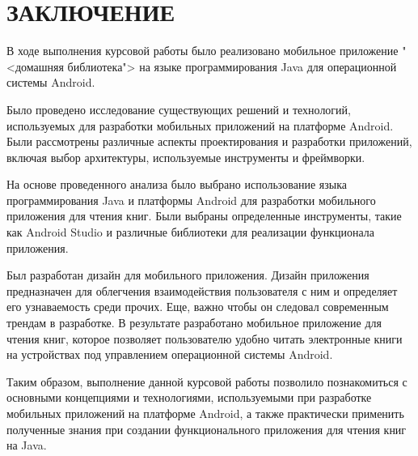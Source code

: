 \chapter*{ЗАКЛЮЧЕНИЕ}
В ходе выполнения курсовой работы было реализовано
мобильное приложение "<домашняя библиотека"> на языке программирования Java
для операционной системы Android.\par
Было проведено исследование существующих решений и технологий, используемых
для разработки мобильных приложений на платформе Android.
Были рассмотрены различные аспекты проектирования и разработки приложений,
включая выбор архитектуры, используемые инструменты и фреймворки.\par
На основе проведенного анализа было выбрано использование
языка программирования Java и платформы Android для разработки
мобильного приложения для чтения книг. Были выбраны определенные инструменты,
такие как Android Studio и различные библиотеки
для реализации функционала приложения.\par
Был разработан дизайн для мобильного приложения. Дизайн
приложения предназначен для облегчения взаимодействия пользователя с ним
и определяет его узнаваемость среди прочих. Еще, важно чтобы он следовал
современным трендам в разработке.
В результате разработано мобильное приложение для чтения книг,
которое позволяет пользователю удобно читать электронные книги
на устройствах под управлением операционной системы Android.\par
Таким образом, выполнение данной курсовой работы позволило познакомиться
с основными концепциями и технологиями,
используемыми при разработке мобильных приложений на платформе Android,
а также практически применить полученные знания
при создании функционального приложения для чтения книг на Java.

